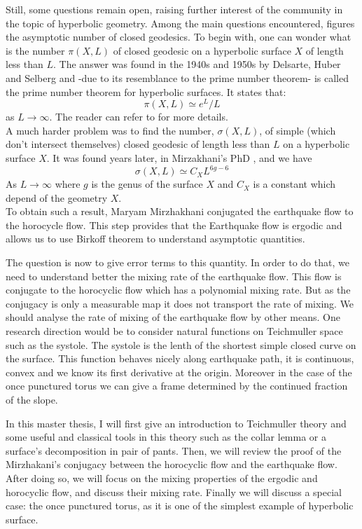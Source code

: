 \vspace{10 px}

Still, some questions remain open, raising further interest of the community in the topic of hyperbolic geometry.
Among the main questions encountered, figures the asymptotic number of closed geodesics. To begin with, one can wonder what is the number $\pi(X,L)$ of closed geodesic on a hyperbolic surface $X$ of length less than $L$. The answer was found in the 1940s and 1950s by Delsarte, Huber and Selberg and -due to its resemblance to the prime number theorem- is called the prime number theorem for hyperbolic surfaces. It states that:\[
\pi(X,L) \simeq e^{L} / L
\]
as $L \to \infty$. The reader can refer to \cite{buser2010geometry} for more details.\\

A much harder problem was to find the number, $\sigma(X,L)$, of simple (which don't intersect themselves) closed geodesic of length less than $L$ on a hyperbolic surface $X$. It was found years later, in Mirzakhani's PhD \cite{mirzakhani2004simple}, and we have \[
\sigma(X,L) \simeq C_{X}L^{6g-6}
\]
As $L \to \infty$ where $g$ is the genus of the surface $X$ and $C_{X}$ is a constant which depend of the geometry $X$.\\
To obtain such a result, Maryam Mirzhakhani conjugated the earthquake flow to the horocycle flow. This step provides that the Earthquake flow is ergodic and allows us to use Birkoff theorem to understand asymptotic quantities.

\vspace{10 px}

The question is now to give error terms to this quantity. In order to do that, we need to understand better the mixing rate of the earthquake flow. This flow is conjugate to the horocyclic flow which has a polynomial mixing rate. But as the conjugacy is only a measurable map it does not transport the rate of mixing. We should analyse the rate of mixing of the earthquake flow by other means. One research direction would be to consider natural functions on Teichmuller space such as the systole. The systole is the lenth of the shortest simple closed curve on the surface. This function behaves nicely along earthquake path, it is continuous, convex and we know its first derivative at the origin. Moreover in the case of the once punctured torus we can give a frame determined by the continued fraction of the slope.

\vspace{10 px}

In this master thesis, I will first give an introduction to Teichmuller theory and some useful and classical tools in this theory such as the collar lemma or a surface's decomposition in pair of pants. Then, we will review the proof of the Mirzhakani's conjugacy between the horocyclic flow and the earthquake flow. After doing so, we will focus on the mixing properties of the ergodic and horocyclic flow, and discuss their mixing rate. Finally we will discuss a special case: the once punctured torus, as it is one of the simplest example of hyperbolic surface.
